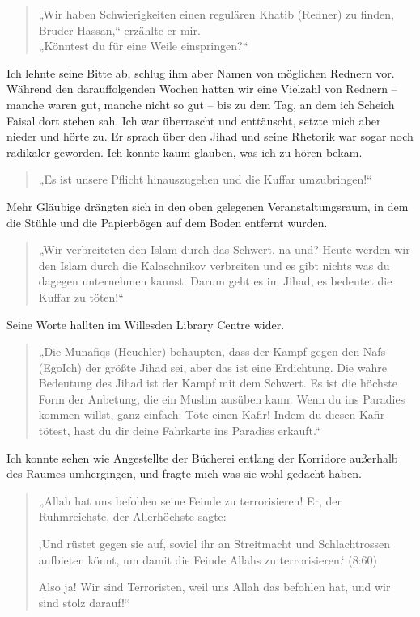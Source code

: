 \documentclass[12pt]{memoir}
\begin{document}
\begin{quote}
„Wir haben Schwierigkeiten einen regulären Khatib (Redner) zu finden,
Bruder Hassan,“ erzählte er mir.\\
„Könntest du für eine Weile einspringen?“
\end{quote}

Ich lehnte seine Bitte ab,
schlug ihm aber Namen von möglichen Rednern vor.
Während den darauffolgenden Wochen hatten wir eine Vielzahl von Rednern –
manche waren gut, manche nicht so gut –
bis zu dem Tag, an dem ich Scheich Faisal dort stehen sah.
Ich war überrascht und enttäuscht, setzte mich aber nieder und hörte zu.
Er sprach über den Jihad und seine Rhetorik
war sogar noch radikaler geworden.
Ich konnte kaum glauben, was ich zu hören bekam.

\begin{quote}
„Es ist unsere Pflicht hinauszugehen und die Kuffar umzubringen!“
\end{quote}

Mehr Gläubige drängten sich in den oben gelegenen Veranstaltungsraum,
in dem die Stühle und die Papierbögen auf dem Boden entfernt wurden.

\begin{quote}
„Wir verbreiteten den Islam durch das Schwert, na und?
Heute werden wir den Islam durch die Kalaschnikov verbreiten
und es gibt nichts was du dagegen unternehmen kannst.
Darum geht es im Jihad, es bedeutet die Kuffar zu töten!“
\end{quote}

Seine Worte hallten im Willesden Library Centre wider.

\begin{quote}
„Die Munafiqs (Heuchler) behaupten,
dass der Kampf gegen den Nafs (Ego\/Ich) der größte Jihad sei,
aber das ist eine Erdichtung.
Die wahre Bedeutung des Jihad ist der Kampf mit dem Schwert.
Es ist die höchste Form der Anbetung, die ein Muslim ausüben kann.
Wenn du ins Paradies kommen willst, ganz einfach:
Töte einen Kafir!
Indem du diesen Kafir tötest,
hast du dir deine Fahrkarte ins Paradies erkauft.“
\end{quote}

Ich konnte sehen wie Angestellte der Bücherei
entlang der Korridore außerhalb des Raumes umhergingen,
und fragte mich was sie wohl gedacht haben.

\begin{quote}
„Allah hat uns befohlen seine Feinde zu terrorisieren!
Er, der Ruhmreichste, der Allerhöchste sagte:

‚Und rüstet gegen sie auf, soviel ihr an Streitmacht
und Schlachtrossen aufbieten könnt,
um damit die Feinde Allahs zu terrorisieren.‘
(8:60)

Also ja! Wir sind Terroristen,
weil uns Allah das befohlen hat, und wir sind stolz darauf!“
\end{quote}
\end{document}
